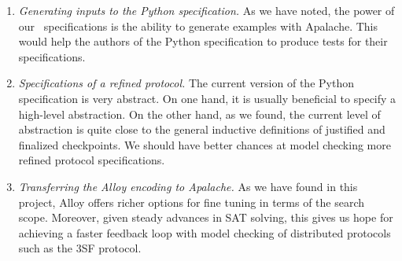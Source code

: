 
\begin{enumerate}

  \item \emph{Generating inputs to the Python specification.} As we have noted,
    the power of our~\tlap{} specifications is the ability to generate examples
    with Apalache. This would help the authors of the Python specification to
    produce tests for their specifications.

  \item \emph{Specifications of a refined protocol.} The current version of
    the Python specification is very abstract. On one hand, it is usually
    beneficial to specify a high-level abstraction. On the other hand, as we
    found, the current level of abstraction is quite close to the general inductive
    definitions of justified and finalized checkpoints. We should have better
    chances at model checking more refined protocol specifications.

  \item \emph{Transferring the Alloy encoding to Apalache.} As we have found in
    this project, Alloy offers richer options for fine tuning in terms of the
    search scope. Moreover, given steady advances in SAT solving, this gives us
    hope for achieving a faster feedback loop with model checking of
    distributed protocols such as the 3SF protocol.

\end{enumerate}

